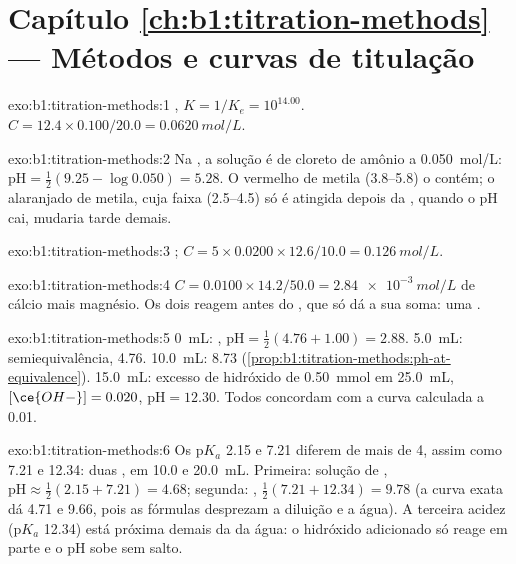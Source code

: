 \section*{Capítulo \ref{ch:b1:titration-methods} --- Métodos e curvas de titulação}

\begin{solution}{exo:b1:titration-methods:1}
, $K = 1/K_e = 10^{14.00}$. $C = 12.4 \times
0.100/20.0 = \qty{0.0620}{mol/L}$.
\end{solution}

\begin{solution}{exo:b1:titration-methods:2}
Na , a solução é de cloreto de amônio a
\qty{0.050}{mol/L}: $\mathrm{pH} = \frac12(9.25 - \log 0.050) = 5.28$.
O vermelho de metila (3.8--5.8) o contém; o alaranjado de metila, cuja faixa (2.5--4.5) só é atingida depois da , quando o pH cai, mudaria tarde demais.
\end{solution}

\begin{solution}{exo:b1:titration-methods:3}
;
$C = 5 \times 0.0200 \times 12.6/10.0 = \qty{0.126}{mol/L}$.
\end{solution}

\begin{solution}{exo:b1:titration-methods:4}
$C = 0.0100 \times 14.2/50.0 = \qty{2.84e-3}{mol/L}$ de cálcio mais
magnésio. Os dois reagem antes do , que só dá a sua soma:
uma .
\end{solution}

\begin{solution}{exo:b1:titration-methods:5}
0~mL: , $\mathrm{pH} = \frac12(4.76 + 1.00) = 2.88$. 5.0~mL:
semiequivalência, 4.76. 10.0~mL: 8.73
(\cref{prop:b1:titration-methods:ph-at-equivalence}). 15.0~mL: excesso
de hidróxido de \qty{0.50}{mmol} em \qty{25.0}{mL}, $[\ce{OH-}] = 0.020$,
$\mathrm{pH} = 12.30$. Todos concordam com a curva calculada a 0.01.
\end{solution}

\begin{solution}{exo:b1:titration-methods:6}
Os $\mathrm{p}K_a$ 2.15 e 7.21 diferem de mais de 4, assim como 7.21 e
12.34: duas , em 10.0 e \qty{20.0}{mL}. Primeira: solução
de , $\mathrm{pH} \approx \frac12(2.15 + 7.21) = 4.68$;
segunda: , $\frac12(7.21 + 12.34) = 9.78$ (a curva exata dá
4.71 e 9.66, pois as fórmulas desprezam a diluição e a água). A terceira
acidez ($\mathrm{p}K_a$ 12.34) está próxima demais da da água: o
hidróxido adicionado só reage em parte e o pH sobe sem salto.
\end{solution}

